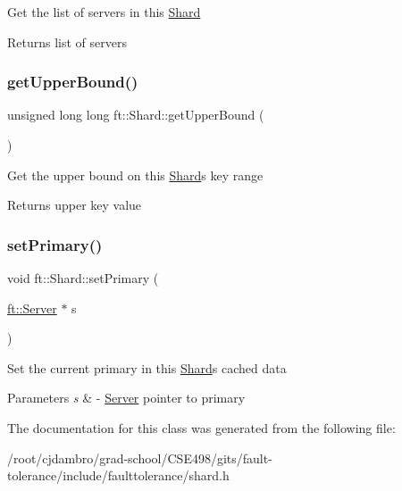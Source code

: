 Get the list of servers in this \mbox{\hyperlink{classft_1_1Shard}{Shard}}

\begin{DoxyReturn}{Returns}
list of servers 
\end{DoxyReturn}
\mbox{\label{classft_1_1Shard_adf483639946d24a658d2e07a498e08b2}} 
\subsubsection{\texorpdfstring{get\+Upper\+Bound()}{getUpperBound()}}
{\footnotesize\ttfamily unsigned long long ft\+::\+Shard\+::get\+Upper\+Bound (\begin{DoxyParamCaption}{ }\end{DoxyParamCaption})\hspace{0.3cm}{\ttfamily [inline]}}

Get the upper bound on this \mbox{\hyperlink{classft_1_1Shard}{Shard}}\textquotesingle{}s key range

\begin{DoxyReturn}{Returns}
upper key value 
\end{DoxyReturn}
\mbox{\label{classft_1_1Shard_a9a850b8347f8be6b939f00ee91463da7}} 
\subsubsection{\texorpdfstring{set\+Primary()}{setPrimary()}}
{\footnotesize\ttfamily void ft\+::\+Shard\+::set\+Primary (\begin{DoxyParamCaption}\item[{\mbox{\hyperlink{classft_1_1Server}{ft\+::\+Server}} $\ast$}]{s }\end{DoxyParamCaption})\hspace{0.3cm}{\ttfamily [inline]}}

Set the current primary in this \mbox{\hyperlink{classft_1_1Shard}{Shard}}\textquotesingle{}s cached data


\begin{DoxyParams}{Parameters}
{\em s} & -\/ \mbox{\hyperlink{classft_1_1Server}{Server}} pointer to primary \\
\hline
\end{DoxyParams}


The documentation for this class was generated from the following file\+:\begin{DoxyCompactItemize}
\item 
/root/cjdambro/grad-\/school/\+C\+S\+E498/gits/fault-\/tolerance/include/faulttolerance/shard.\+h\end{DoxyCompactItemize}
